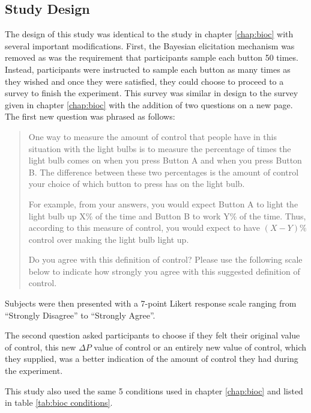 \documentclass[USenglish,letterpaper,12pt,extrafontsizes,oneside,onecolumn,final]{memoir}
\newcommand{\deltap}{$\Delta P$}
\begin{document}
\subsection{Study Design}
The design of this study was identical to the study in chapter \ref{chap:bioc} with several important modifications.  First, the Bayesian elicitation mechanism was removed as was the requirement that participants sample each button 50 times.  Instead, participants were instructed to sample each button as many times as they wished and once they were satisfied, they could choose to proceed to a survey to finish the experiment.  This survey was similar in design to the survey given in chapter \ref{chap:bioc} with the addition of two questions on a new page.  The first new question was phrased as follows: 
\begin{quotation}
One way to measure the amount of control that people have in this situation with the light bulbs is to measure the percentage of times the light bulb comes on when you press Button A and when you press Button B.  The difference between these two percentages is the amount of control your choice of which button to press has on the light bulb. 

For example, from your answers, you would expect Button A to light the light bulb up X\% of the time and Button B to work Y\% of the time.  Thus, according to this measure of control, you would expect to have $(X - Y)\%$ control over making the light bulb light up. 

Do you agree with this definition of control? 
Please use the following scale below to indicate how strongly you agree with this suggested definition of control.
\end{quotation}

Subjects were then presented with a 7-point Likert response scale ranging from ``Strongly Disagree'' to ``Strongly Agree''.

The second question asked participants to choose if they felt their original value of control, this new \deltap \xspace value of control or an entirely new value of control, which they supplied, was a better indication of the amount of control they had during the experiment.

This study also used the same 5 conditions used in chapter \ref{chap:bioc} and listed in table \ref{tab:bioc conditions}.  
\end{document}
